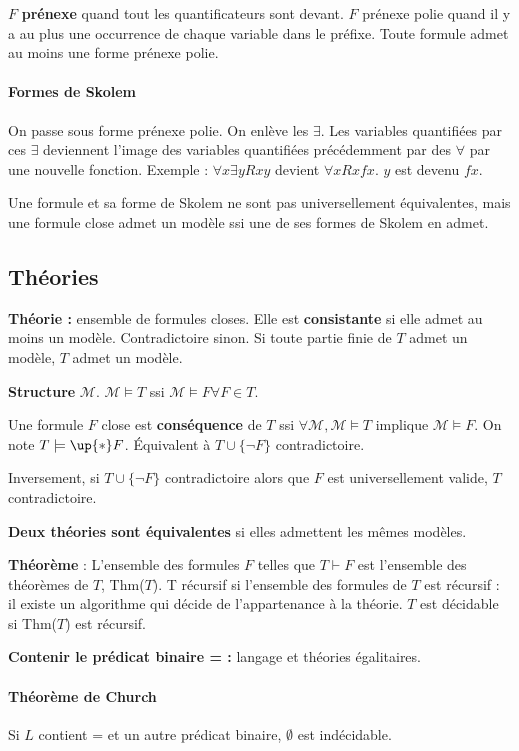 \documentclass[french]{article}
\begin{document}
$F$ \textbf{prénexe} quand tout les quantificateurs sont devant. $F$ prénexe polie quand il y a au plus une occurrence de chaque variable dans le préfixe. Toute formule admet au moins une forme prénexe polie.

\paragraph{Formes de Skolem}
On passe sous forme prénexe polie. On enlève les $\exists$. Les variables quantifiées par ces $\exists$ deviennent l'image des variables quantifiées précédemment par des $\forall$ par une nouvelle fonction.
Exemple : $\forall x\exists y Rxy$ devient $\forall x Rxfx$. $y$ est devenu $fx$.

Une formule et sa forme de Skolem ne sont pas universellement équivalentes, mais une formule close admet un modèle ssi une de ses formes de Skolem en admet.

\subsection{Théories}
\textbf{Théorie :} ensemble de formules closes. Elle est \textbf{consistante} si elle admet au moins un modèle. Contradictoire sinon. Si toute partie finie de $T$ admet un modèle, $T$ admet un modèle.

\textbf{Structure} $\mathcal{M}$. $\mathcal{M}\models T$ ssi $\mathcal{M}\models F\forall F\in T$.

Une formule $F$ close est \textbf{conséquence} de $T$ ssi $\forall\mathcal{M}, \mathcal{M}\models T$ implique $\mathcal{M}\models F$. On note $T\models\up{*} F$. Équivalent à $T\cup\{\neg F\}$ contradictoire.

Inversement, si $T\cup\{\neg F\}$ contradictoire alors que $F$ est universellement valide, $T$ contradictoire.

\textbf{Deux théories sont équivalentes} si elles admettent les mêmes modèles.

\textbf{Théorème} : L'ensemble des formules $F$ telles que $T\vdash F$ est l'ensemble des théorèmes de $T$, Thm($T$). T récursif si l'ensemble des formules de $T$ est récursif : il existe un algorithme qui décide de l'appartenance à la théorie. $T$ est décidable si Thm($T$) est récursif.

\textbf{Contenir le prédicat binaire = :} langage et théories égalitaires.

\paragraph{Théorème de Church} Si $L$ contient = et un autre prédicat binaire, $\emptyset$ est indécidable.
\end{document}
